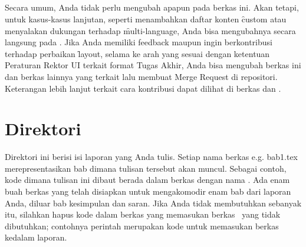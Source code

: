 \subsection{}
\label{sec:uithesis.sty}
Secara umum, Anda tidak perlu mengubah apapun pada berkas ini.
Akan tetapi, untuk kasus-kasus lanjutan, seperti menambahkan daftar konten \f{custom} atau menyalakan dukungan terhadap \f{multi-language}, Anda bisa mengubahnya secara langsung pada .
Jika Anda memiliki feedback maupun ingin berkontribusi terhadap perbaikan \f{layout}, selama ke arah yang sesuai dengan ketentuan Peraturan Rektor UI terkait format Tugas Akhir, Anda bisa mengubah berkas ini dan berkas lainnya yang terkait lalu membuat Merge Request di repositori.
Keterangan lebih lanjut terkait cara kontribusi dapat dilihat di berkas  dan .


\section{Direktori }
\label{sec:bab-tex}
Direktori ini berisi isi laporan yang Anda tulis.
Setiap nama berkas e.g. bab1.tex merepresentasikan bab dimana tulisan tersebut akan muncul.
Sebagai contoh, kode dimana tulisan ini dibaut berada dalam berkas dengan nama .
Ada enam buah berkas yang telah disiapkan untuk mengakomodir enam bab dari laporan Anda, diluar bab kesimpulan dan saran.
Jika Anda tidak membutuhkan sebanyak itu, silahkan hapus kode dalam berkas  yang memasukan berkas \latex~yang tidak dibutuhkan; contohnya perintah  merupakan kode untuk memasukan berkas  kedalam laporan.
